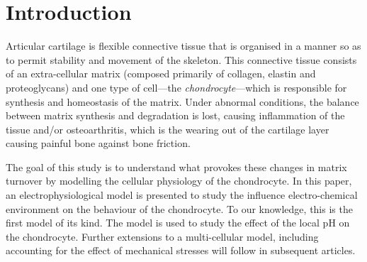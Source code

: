 \section{Introduction}
\label{introduction}

Articular cartilage is flexible connective tissue that is organised in
a manner so as to permit stability and movement of the skeleton. This
connective tissue consists of an extra-cellular matrix (composed
primarily of collagen, elastin and proteoglycans) and one type of
cell---the {\em chondrocyte}---which is responsible for synthesis and
homeostasis of the matrix. Under abnormal conditions, the balance
between matrix synthesis and degradation is lost, causing inflammation
of the tissue and/or osteoarthritis, which is the wearing out of the
cartilage layer causing painful bone against bone friction.

The goal of this study is to understand what provokes these changes in
matrix turnover by modelling the cellular physiology of the
chondrocyte. In this paper, an electrophysiological model is presented
to study the influence electro-chemical environment on the behaviour
of the chondrocyte. To our knowledge, this is the first model of its
kind. The model is used to study the effect of the local pH on the
chondrocyte. Further extensions to a multi-cellular model, including
accounting for the effect of mechanical stresses will follow in
subsequent articles.

